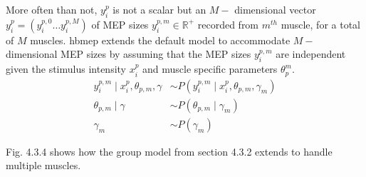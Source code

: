 \documentclass[a4paper,12pt]{article}
\begin{document}
More often than not, $y_i^p$ is not a scalar but an $M-$ dimensional vector $y_i^p = (y_i^{p, 0} \ldots y_i^{p, M})$ of MEP sizes $y_i^{p, m} \in \mathbb{R}^+$ recorded from $m^{th}$ muscle, for a total of $M$ muscles. hbmep extends the default model to accommodate $M-$ dimensional MEP sizes by assuming that the MEP sizes $y_i^{p, m}$ are independent given the stimulus intensity $x_i^p$ and muscle specific parameters $\theta_p^m$.
\begin{align*}
    y_i^{p, m} \mid x_i^p, \theta_{p, m}, \gamma &\sim P(y_i^{p, m} \mid x_i^p, \theta_{p, m}, \gamma_m) \tag{4.3.4} \\
    \theta_{p, m} \mid \gamma &\sim P(\theta_{p, m} \mid \gamma_m) \tag{4.3.5} \\
    \gamma_m &\sim P(\gamma_m) \tag{4.3.6}
\end{align*}

Fig. 4.3.4 shows how the group model from section 4.3.2 extends to handle multiple muscles.
\end{document}
